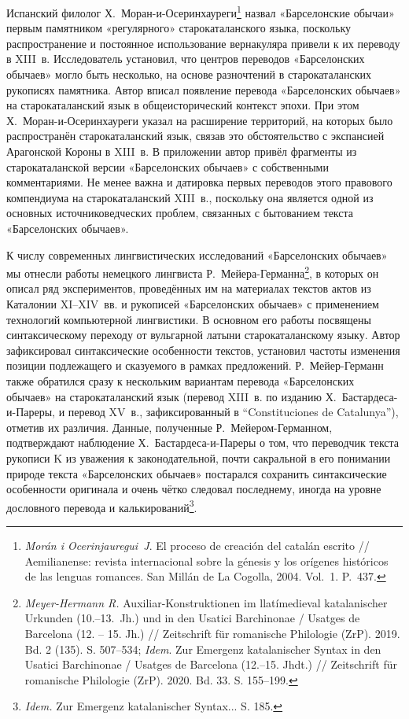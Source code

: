 Испанский филолог Х.~Моран-и-Осеринхауреги\footnote{\emph{Morán i Ocerinjauregui~J}. El proceso de creación del catalán escrito // Aemilianense: revista internacional sobre la génesis y los orígenes históricos de las lenguas romances. San Millán de La Cogolla, 2004. Vol.~1. P.~437.} назвал «Барселонские обычаи» первым памятником «регулярного» старокаталанского языка, поскольку распространение и постоянное использование вернакуляра привели к их переводу в XIII~в. Исследователь установил, что центров переводов «Барселонских обычаев» могло быть несколько, на основе разночтений в старокаталанских рукописях памятника. Автор вписал появление перевода «Барселонских обычаев» на старокаталанский язык в общеисторический контекст эпохи. При этом Х.~Моран-и-Осеринхауреги указал на расширение территорий, на которых было распространён старокаталанский язык, связав это обстоятельство с экспансией Арагонской Короны в XIII~в. В приложении автор привёл фрагменты из старокаталанской версии «Барселонских обычаев» с собственными комментариями. Не менее важна и датировка первых переводов этого правового компендиума на старокаталанский XIII~в., поскольку она является одной из основных источниковедческих проблем, связанных с бытованием текста «Барселонских обычаев».

К числу современных лингвистических исследований «Барселонских обычаев» мы отнесли работы немецкого лингвиста Р.~Мейера-Германна\footnote{\emph{Meyer-Hermann R. }Auxiliar-Konstruktionen im llatímedieval katalanischer Urkunden (10.--13.~Jh.) und in den Usatici Barchinonae / Usatges de Barcelona (12. -- 15. Jh.) // Zeitschrift für romanische Philologie (ZrP). 2019. Bd. 2 (135). S. 507--534; \emph{Idem}. Zur Emergenz katalanischer Syntax in den Usatici Barchinonae / Usatges de Barcelona (12.--15. Jhdt.) // Zeitschrift für romanische Philologie (ZrP). 2020. Bd. 33. S. 155--199.}, в которых он описал ряд экспериментов, проведённых им на материалах текстов актов из Каталонии XI--XIV~вв. и рукописей «Барселонских обычаев» с применением технологий компьютерной лингвистики. В основном его работы посвящены синтаксическому переходу от вульгарной латыни старокаталанскому языку. Автор зафиксировал синтаксические особенности текстов, установил частоты изменения позиции подлежащего и сказуемого в рамках предложений. Р.~Мейер-Германн также обратился сразу к нескольким вариантам перевода «Барселонских обычаев» на старокаталанский язык (перевод XIII~в. по изданию Х.~Бастардеса-и-Пареры, и перевод XV~в., зафиксированный в “Constituciones de Catalunya”), отметив их различия. Данные, полученные Р.~Мейером-Германном, подтверждают наблюдение Х.~Бастардеса-и-Пареры о том, что переводчик текста рукописи K из уважения к законодательной, почти сакральной в его понимании природе текста «Барселонских обычаев» постарался сохранить синтаксические особенности оригинала и очень чётко следовал последнему, иногда на уровне дословного перевода и калькирований\footnote{\emph{Idem. }Zur Emergenz katalanischer Syntax... S. 185.}.

